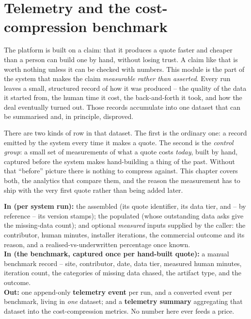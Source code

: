 \chapter{Telemetry and the cost-compression benchmark}
\label{ch:telemetry}

The platform is built on a claim: that it produces a quote faster and cheaper than a person can build one by hand, without losing trust. A claim like that is worth nothing unless it can be checked with numbers. This module is the part of the system that makes the claim \emph{measurable rather than asserted}. Every run leaves a small, structured record of how it was produced -- the quality of the data it started from, the human time it cost, the back-and-forth it took, and how the deal eventually turned out. Those records accumulate into one dataset that can be summarised and, in principle, disproved.

There are two kinds of row in that dataset. The first is the ordinary one: a record emitted by the system every time it makes a quote. The second is the \emph{control group}: a small set of measurements of what a quote costs \emph{today}, built by hand, captured before the system makes hand-building a thing of the past. Without that ``before'' picture there is nothing to compress against. This chapter covers both, the analytics that compare them, and the reason the measurement has to ship with the very first quote rather than being added later.


\begin{contract}
\textbf{In (per system run):} the assembled  (its quote identifier, its data tier, and -- by reference -- its version stamps); the populated  (whose outstanding data asks give the missing-data count); and optional \emph{measured} inputs supplied by the caller: the contributor, human minutes, installer iterations, the commercial outcome and its reason, and a realised-vs-underwritten percentage once known. \\[3pt]
\textbf{In (the benchmark, captured once per hand-built quote):} a manual benchmark record -- site, contributor, date, data tier, measured human minutes, iteration count, the categories of missing data chased, the artifact type, and the outcome. \\[3pt]
\textbf{Out:} one append-only \textbf{telemetry event} per run, and a converted event per benchmark, living in \emph{one} dataset; and a \textbf{telemetry summary} aggregating that dataset into the cost-compression metrics. No number here ever feeds a price.
\end{contract}

